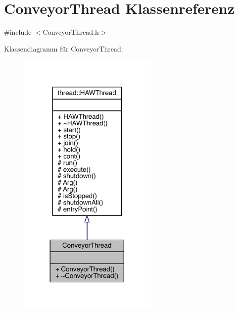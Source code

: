 \hypertarget{class_conveyor_thread}{}\section{Conveyor\+Thread Klassenreferenz}
\label{class_conveyor_thread}


{\ttfamily \#include $<$Conveyor\+Thread.\+h$>$}



Klassendiagramm für Conveyor\+Thread\+:
\nopagebreak
\begin{figure}[H]
\begin{center}
\leavevmode
\includegraphics[width=192pt]{class_conveyor_thread__inherit__graph}
\end{center}
\end{figure}


